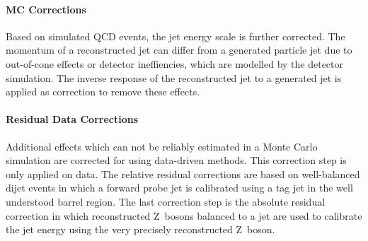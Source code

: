 \paragraph{MC Corrections}

Based on simulated QCD events, the jet energy scale is further corrected. The
momentum of a reconstructed jet can differ from a generated particle jet due to
out-of-cone effects or detector ineffiencies, which are modelled by the detector
simulation. The inverse response of the reconstructed jet to a generated jet is
applied as correction to remove these effects.

\paragraph{Residual Data Corrections}

Additional effects which can not be reliably estimated in a Monte Carlo
simulation are corrected for using data-driven methods. This correction step is
only applied on data. The relative residual corrections are based on
well-balanced dijet events in which a forward probe jet is calibrated using a
tag jet in the well understood barrel region. The last correction step is the
absolute residual correction in which reconstructed Z~bosons balanced to a jet
are used to calibrate the jet energy using the very precisely reconstructed Z~boson.


